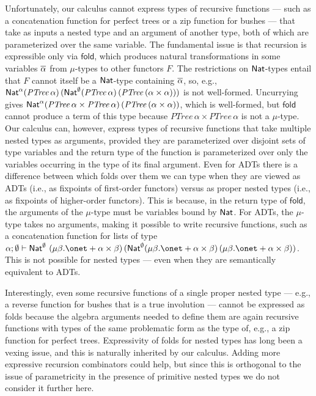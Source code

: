 \documentclass{lmcs}
\theoremstyle{plain}\newtheorem{satz}[thm]{Satz}
\newcommand{\fold}{\mathsf{fold}}
\begin{document}
{Unfortunately, our calculus cannot express types of recursive
functions --- such as a concatenation function for perfect trees or a
zip function for bushes --- that take as inputs a nested type and an
argument of another type, both of which are parameterized over the
same variable. The fundamental issue is that recursion is expressible
only via $\fold$, which produces natural transformations in some
variables $\overline{\alpha}$ from $\mu$-types to other functors $F$. The
restrictions on $\mathsf{Nat}$-types entail that $F$ cannot itself be a
$\mathsf{Nat}$-type containing $\overline{\alpha}$, so, e.g., $\mathsf{Nat}^\alpha
(\mathit{PTree}\,\alpha) \,(\mathsf{Nat}^\emptyset (\mathit{PTree}\,\alpha)\,
(\mathit{PTree}\,(\alpha \times \alpha)))$ is not well-formed.
Uncurrying gives $\mathsf{Nat}^\alpha (\mathit{PTree}\,\alpha \times
\mathit{PTree}\,\alpha)\, (\mathit{PTree}\,(\alpha \times \alpha))$,
which is well-formed, but $\mathsf{fold}$ cannot produce a term of this
type because $\mathit{PTree}\,\alpha \times \mathit{PTree}\,\alpha$ is
not a $\mu$-type. Our calculus can, however, express types of
recursive functions that take multiple nested types as arguments,
provided they are parameterized over disjoint sets of type variables
and the return type of the function is parameterized over only the
variables occurring in the type of its final argument. Even for ADTs
there is a difference between which folds over them we can type when
they are viewed as ADTs (i.e., as fixpoints of first-order functors)
versus as proper nested types (i.e., as fixpoints of higher-order
functors). This is because, in the return type of $\mathsf{fold}$, the
arguments of the $\mu$-type must be variables bound by $\mathsf{Nat}$.  For
ADTs, the $\mu$-type takes no arguments, making it possible to write
recursive functions, such as a concatenation function for lists of
type $\alpha ; \emptyset \vdash \Nat^\emptyset \ (\mu \beta. \onet +
\alpha \times \beta)\, (\Nat^\emptyset (\mu \beta. \onet + \alpha
\times \beta) \, (\mu \beta. \onet + \alpha \times \beta))$.  This is
not possible for nested types --- even when they are semantically
equivalent to ADTs.

Interestingly, even some recursive functions of a single proper nested
type --- e.g., a reverse function for bushes that is a true involution
--- cannot be expressed as folds because the algebra arguments needed
to define them are again recursive functions with types of the same
problematic form as the type of, e.g., a zip function for perfect
trees.  Expressivity of folds for nested types has long been a vexing
issue, and this is naturally inherited by our calculus. Adding more
expressive recursion combinators could help, but since this is
orthogonal to the issue of parametricity in the presence of primitive
nested types we do not consider it further here.

}
\end{document}
